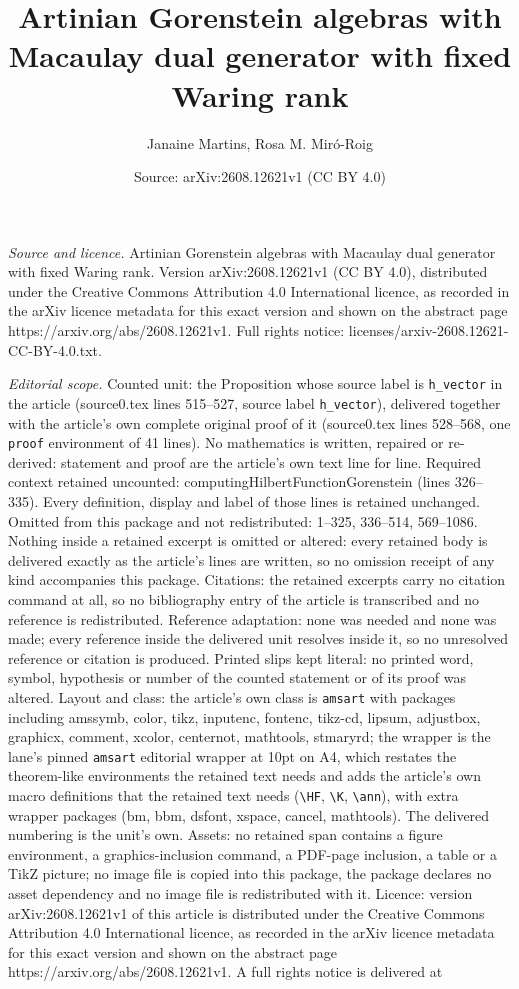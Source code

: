 \documentclass[10pt,a4paper]{amsart}
\title[Artinian Gorenstein algebras with Macaulay dual generator wi]{Artinian Gorenstein algebras with Macaulay dual generator with fixed Waring rank}
\author{Janaine Martins, Rosa M. Mir\'o-Roig}
\date{Source: arXiv:2608.12621v1 (CC BY 4.0)}
\begin{document}
\maketitle

\noindent\emph{Source and licence.} Artinian Gorenstein algebras with Macaulay dual generator with fixed Waring rank. Version arXiv:2608.12621v1 (CC BY 4.0), distributed under the Creative Commons Attribution 4.0 International licence, as recorded in the arXiv licence metadata for this exact version and shown on the abstract page https://arxiv.org/abs/2608.12621v1. Full rights notice: licenses/arxiv-2608.12621-CC-BY-4.0.txt.\par\smallskip

\noindent\textit{Editorial scope.} Counted unit: the Proposition whose source label is \texttt{h\_vector} in the article (source0.tex lines 515--527, source label \texttt{h\_vector}), delivered together with the article's own complete original proof of it (source0.tex lines 528--568, one \texttt{proof} environment of 41 lines). No mathematics is written, repaired or re-derived: statement and proof are the article's own text line for line. Required context retained uncounted: computingHilbertFunctionGorenstein (lines 326--335). Every definition, display and label of those lines is retained unchanged. Omitted from this package and not redistributed: 1--325, 336--514, 569--1086. Nothing inside a retained excerpt is omitted or altered: every retained body is delivered exactly as the article's lines are written, so no omission receipt of any kind accompanies this package. Citations: the retained excerpts carry no citation command at all, so no bibliography entry of the article is transcribed and no reference is redistributed. Reference adaptation: none was needed and none was made; every reference inside the delivered unit resolves inside it, so no unresolved reference or citation is produced. Printed slips kept literal: no printed word, symbol, hypothesis or number of the counted statement or of its proof was altered. Layout and class: the article's own class is \texttt{amsart} with packages including amssymb, color, tikz, inputenc, fontenc, tikz-cd, lipsum, adjustbox, graphicx, comment, xcolor, centernot, mathtools, stmaryrd; the wrapper is the lane's pinned \texttt{amsart} editorial wrapper at 10pt on A4, which restates the theorem-like environments the retained text needs and adds the article's own macro definitions that the retained text needs (\texttt{\textbackslash HF}, \texttt{\textbackslash K}, \texttt{\textbackslash ann}), with extra wrapper packages (bm, bbm, dsfont, xspace, cancel, mathtools). The delivered numbering is the unit's own. Assets: no retained span contains a figure environment, a graphics-inclusion command, a PDF-page inclusion, a table or a TikZ picture; no image file is copied into this package, the package declares no asset dependency and no image file is redistributed with it. Licence: version arXiv:2608.12621v1 of this article is distributed under the Creative Commons Attribution 4.0 International licence, as recorded in the arXiv licence metadata for this exact version and shown on the abstract page https://arxiv.org/abs/2608.12621v1. A full rights notice is delivered at 
\end{document}
